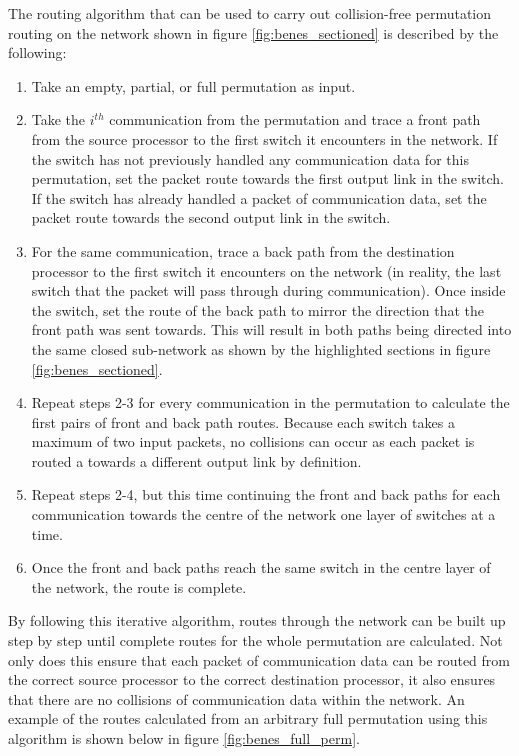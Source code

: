 \documentclass[a4paper, 12pt]{article}
\begin{document}
The routing algorithm that can be used to carry out collision-free permutation routing on the network shown in figure \ref{fig:benes_sectioned} is described by the following:
\begin{enumerate}[leftmargin=*,labelindent=15pt,label=\bfseries \arabic*.]
	\item Take an empty, partial, or full permutation as input.
	\item Take the $i^{th}$ communication from the permutation and trace a front path from the source processor to the first switch it encounters in the network. If the switch has not previously handled any communication data for this permutation, set the packet route towards the first output link in the switch. If the switch has already handled a packet of communication data, set the packet route towards the second output link in the switch.
	\item For the same communication, trace a back path from the destination processor to the first switch it encounters on the network (in reality, the last switch that the packet will pass through during communication). Once inside the switch, set the route of the back path to mirror the direction that the front path was sent towards. This will result in both paths being directed into the same closed sub-network as shown by the highlighted sections in figure \ref{fig:benes_sectioned}.
	\item Repeat steps 2-3 for every communication in the permutation to calculate the first pairs of front and back path routes. Because each switch takes a maximum of two input packets, no collisions can occur as each packet is routed a towards a different output link by definition.
	\item Repeat steps 2-4, but this time continuing the front and back paths for each communication towards the centre of the network one layer of switches at a time.
	\item Once the front and back paths reach the same switch in the centre layer of the network, the route is complete.
\end{enumerate}

By following this iterative algorithm, routes through the network can be built up step by step until complete routes for the whole permutation are calculated. Not only does this ensure that each packet of communication data can be routed from the correct source processor to the correct destination processor, it also ensures that there are no collisions of communication data within the network. An example of the routes calculated from an arbitrary full permutation using this algorithm is shown below in figure \ref{fig:benes_full_perm}.
\end{document}
